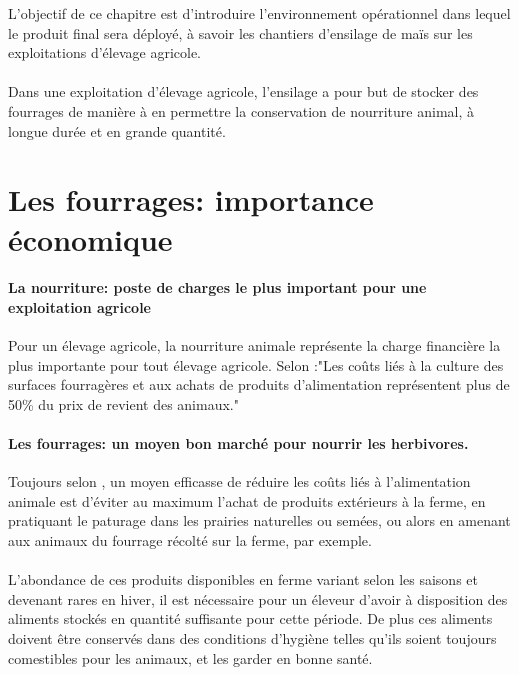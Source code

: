 \documentclass[12pt,a4paper]{report}
\begin{document}
L'objectif de ce chapitre est d'introduire l'environnement opérationnel dans lequel le produit final sera déployé, à savoir les chantiers d'ensilage de maïs sur les exploitations d'élevage agricole.

\paragraph{}

Dans une exploitation d'élevage agricole, l'ensilage a pour but  de stocker des fourrages de manière à en permettre la conservation de nourriture animal, à longue durée et en grande quantité.


\section{Les fourrages: importance économique}

\paragraph{La nourriture: poste de charges le plus important pour une exploitation agricole} Pour un élevage agricole, la nourriture animale représente la charge financière la plus importante pour tout élevage agricole. Selon \cite{noauthor_alimentation_2017} :"Les coûts liés à la culture des surfaces fourragères et aux achats de produits d'alimentation représentent plus de 50\% du prix de revient des animaux."



\paragraph{Les fourrages: un moyen bon marché pour nourrir les herbivores.} Toujours selon \cite{noauthor_alimentation_2017}, un moyen efficasse de réduire les coûts liés à l'alimentation animale est d'éviter au maximum l'achat de produits extérieurs à la ferme, en pratiquant le paturage dans les prairies naturelles ou semées, ou alors en amenant aux animaux du fourrage récolté sur la ferme, par exemple.

\paragraph{} L'abondance de ces produits disponibles en ferme variant selon les saisons et devenant rares en hiver, il est nécessaire pour un éleveur d'avoir à disposition des aliments stockés en quantité suffisante pour cette période. De plus ces aliments doivent être conservés dans des conditions d'hygiène  telles qu'ils soient toujours comestibles pour les animaux, et les garder en bonne santé.
\end{document}
